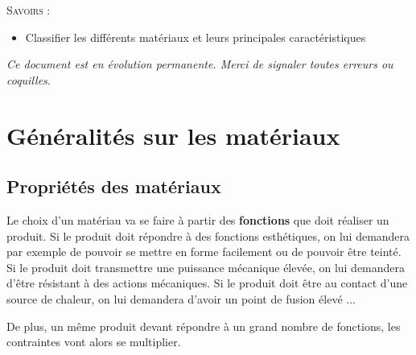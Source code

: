 \documentclass[11pt,oneside]{article}
\begin{document}
\begin{savoir}
\textsc{Savoirs :}
\begin{itemize}
\item Classifier les différents matériaux et leurs principales caractéristiques
\end{itemize}
\end{savoir}


\setlength{\parskip}{0ex plus 0.2ex minus 0ex}
 \renewcommand{\contentsname}{}
 \renewcommand{\baselinestretch}{1}

\tableofcontents

 \renewcommand{\baselinestretch}{1.2}
\setlength{\parskip}{2ex plus 0.5ex minus 0.2ex}

\textit{Ce document est en évolution permanente. Merci de signaler toutes
erreurs ou coquilles.}


\section{Généralités sur les matériaux}
\subsection{Propriétés des matériaux}
Le choix d'un matériau va se faire à partir des \textbf{fonctions} que doit réaliser un produit. 
Si le produit doit répondre à des fonctions esthétiques, on lui demandera par exemple de pouvoir se mettre en forme facilement ou de pouvoir être teinté. Si le produit doit transmettre une puissance mécanique élevée, on lui demandera d'être résistant à des actions mécaniques. Si le
produit doit être au contact d'une source de chaleur, on lui demandera d'avoir un point de fusion élevé ...

De plus, un même produit devant répondre à un grand nombre de fonctions, les contraintes vont alors se multiplier.
\end{document}
